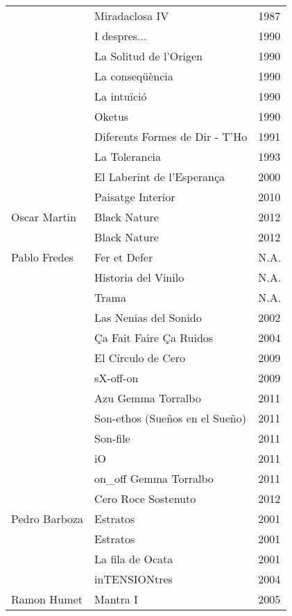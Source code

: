 \begin{center}
\begin{longtable}{ p{}  p{}  p{} }
& Miradaclosa IV & 1987 \\ \cmidrule (r){2-3} 
& I despres... & 1990 \\ \cmidrule (r){2-3} 
& La Solitud de l'Origen & 1990 \\ \cmidrule (r){2-3} 
& La conseqüència & 1990 \\ \cmidrule (r){2-3} 
& La intuïció & 1990 \\ \cmidrule (r){2-3} 
& Oketus & 1990 \\ \cmidrule (r){2-3} 
& Diferents Formes de Dir - T'Ho & 1991 \\ \cmidrule (r){2-3} 
& La Tolerancia & 1993 \\ \cmidrule (r){2-3} 
& El Laberint de l'Esperança & 2000 \\ \cmidrule (r){2-3} 
& Paisatge Interior & 2010 \\ \midrule 
Oscar Martin & Black Nature & 2012 \\ \cmidrule (r){2-3} 
& Black Nature & 2012 \\ \midrule 
Pablo Fredes & Fer et Defer & N.A. \\ \cmidrule (r){2-3} 
& Historia del Vinilo & N.A. \\ \cmidrule (r){2-3} 
& Trama & N.A. \\ \cmidrule (r){2-3} 
& Las Nenias del Sonido & 2002 \\ \cmidrule (r){2-3} 
& Ça Fait Faire Ça Ruidos & 2004 \\ \cmidrule (r){2-3} 
& El Círculo de Cero & 2009 \\ \cmidrule (r){2-3} 
& sX-off-on & 2009 \\ \cmidrule (r){2-3} 
& Azu Gemma Torralbo & 2011 \\ \cmidrule (r){2-3} 
& Son-ethos (Sueños en el Sueño) & 2011 \\ \cmidrule (r){2-3} 
& Son-file & 2011 \\ \cmidrule (r){2-3} 
& iO & 2011 \\ \cmidrule (r){2-3} 
& on\_off Gemma Torralbo & 2011 \\ \cmidrule (r){2-3} 
& Cero Roce Sostenuto & 2012 \\ \midrule 
Pedro Barboza & Estratos & 2001 \\ \cmidrule (r){2-3} 
& Estratos & 2001 \\ \cmidrule (r){2-3} 
& La fila de Ocata & 2001 \\ \cmidrule (r){2-3} 
& inTENSIONtres & 2004 \\ \midrule 
Ramon Humet & Mantra I & 2005 \\ \midrule 

\end{longtable}
\end{center}
